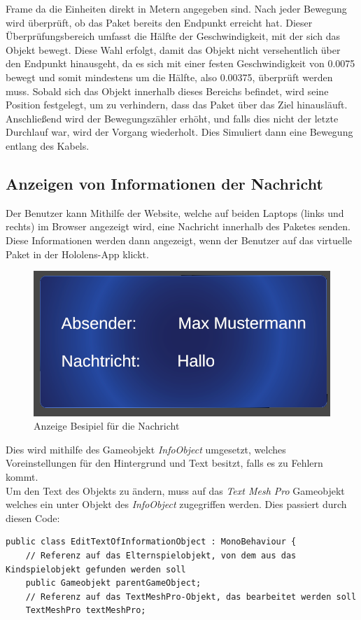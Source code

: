 \begin{itemize}
    Frame da die Einheiten direkt in Metern angegeben sind. Nach jeder Bewegung wird überprüft, ob das Paket bereits den Endpunkt erreicht
    hat. Dieser Überprüfungsbereich umfasst die Hälfte der Geschwindigkeit, mit der sich das Objekt bewegt. Diese Wahl erfolgt, damit das
    Objekt nicht versehentlich über den Endpunkt hinausgeht, da es sich mit einer festen Geschwindigkeit von 0.0075 bewegt und somit mindestens
    um die Hälfte, also 0.00375, überprüft werden muss. Sobald sich das Objekt innerhalb dieses Bereichs befindet, wird seine Position festgelegt,
    um zu verhindern, dass das Paket über das Ziel hinausläuft. Anschließend wird der Bewegungszähler erhöht, und falls dies nicht
    der letzte Durchlauf war, wird der Vorgang wiederholt. Dies Simuliert dann eine Bewegung entlang des Kabels.


    \subsection{\label{sec:pingInfoJonas}Anzeigen von Informationen der Nachricht}
    Der Benutzer kann Mithilfe der Website, welche auf beiden Laptops (links und rechts) im Browser angezeigt wird, eine Nachricht
    innerhalb des Paketes senden. Diese Informationen werden dann angezeigt, wenn der Benutzer auf das virtuelle Paket in der Hololens-App klickt.
    \begin{figure}[H]
        \centering
        \includegraphics[width=0.5\linewidth]{images/NachrichtenAnzeige.png}
        \caption{Anzeige Besipiel für die Nachricht}
        \label{fig:enter-label}
    \end{figure}
    Dies wird mithilfe des Gameobjekt \textit{InfoObject} umgesetzt, welches Voreinstellungen für den Hintergrund und Text besitzt, falls es zu Fehlern kommt. \\
    Um den Text des Objekts zu ändern, muss auf das \textit{Text Mesh Pro} Gameobjekt welches ein unter Objekt des \textit{InfoObject} zugegriffen werden. Dies passiert durch diesen Code:
    \begin{lstlisting}[style=csharp, caption={Kind vom Gameobjekt bekommen}, label=code:]
public class EditTextOfInformationObject : MonoBehaviour {
    // Referenz auf das Elternspielobjekt, von dem aus das Kindspielobjekt gefunden werden soll
    public Gameobjekt parentGameObject;
    // Referenz auf das TextMeshPro-Objekt, das bearbeitet werden soll
    TextMeshPro textMeshPro;


\end{lstlisting}
\end{itemize}
